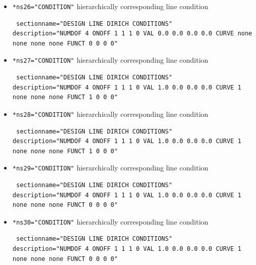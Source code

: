 \begin{itemize}
\item \verb|*ns26="CONDITION"| \qquad hierarchically corresponding line condition
\begin{small} \begin{verbatim} sectionname="DESIGN LINE DIRICH CONDITIONS"
description="NUMDOF 4 ONOFF 1 1 1 0 VAL 0.0 0.0 0.0 0.0 CURVE none none none none FUNCT 0 0 0 0"
\end{verbatim} \end{small}

 \item \verb|*ns27="CONDITION"| \qquad hierarchically corresponding line condition
\begin{small} \begin{verbatim} sectionname="DESIGN LINE DIRICH CONDITIONS"
description="NUMDOF 4 ONOFF 1 1 1 0 VAL 1.0 0.0 0.0 0.0 CURVE 1 none none none FUNCT 1 0 0 0"
\end{verbatim} \end{small}

 \item \verb|*ns28="CONDITION"| \qquad hierarchically corresponding line condition
\begin{small} \begin{verbatim} sectionname="DESIGN LINE DIRICH CONDITIONS"
description="NUMDOF 4 ONOFF 1 1 1 0 VAL 1.0 0.0 0.0 0.0 CURVE 1 none none none FUNCT 1 0 0 0"
\end{verbatim} \end{small}

 \item \verb|*ns29="CONDITION"| \qquad hierarchically corresponding line condition
\begin{small} \begin{verbatim} sectionname="DESIGN LINE DIRICH CONDITIONS"
description="NUMDOF 4 ONOFF 1 1 1 0 VAL 1.0 0.0 0.0 0.0 CURVE 1 none none none FUNCT 0 0 0 0"
\end{verbatim} \end{small}

 \item \verb|*ns30="CONDITION"| \qquad hierarchically corresponding line condition
\begin{small} \begin{verbatim} sectionname="DESIGN LINE DIRICH CONDITIONS"
description="NUMDOF 4 ONOFF 1 1 1 0 VAL 1.0 0.0 0.0 0.0 CURVE 1 none none none FUNCT 0 0 0 0"
\end{verbatim} \end{small}


\end{itemize}
